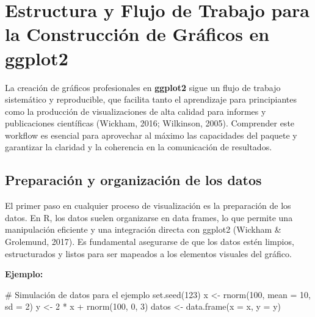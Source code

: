 \documentclass[
  spanish,
  a4paper,
  DIV=11,
  numbers=noendperiod,
  onepage,
  openany]{scrreprt}
\newenvironment{Shaded}{\begin{snugshade}}{\end{snugshade}}
\newcommand{\AttributeTok}[1]{\textcolor[rgb]{0.40,0.45,0.13}{#1}}
\newcommand{\CommentTok}[1]{\textcolor[rgb]{0.37,0.37,0.37}{#1}}
\newcommand{\DecValTok}[1]{\textcolor[rgb]{0.68,0.00,0.00}{#1}}
\newcommand{\FunctionTok}[1]{\textcolor[rgb]{0.28,0.35,0.67}{#1}}
\newcommand{\NormalTok}[1]{\textcolor[rgb]{0.00,0.23,0.31}{#1}}
\newcommand{\OtherTok}[1]{\textcolor[rgb]{0.00,0.23,0.31}{#1}}
\newcommand{\SpecialCharTok}[1]{\textcolor[rgb]{0.37,0.37,0.37}{#1}}
\begin{document}
\section{Estructura y Flujo de Trabajo para la Construcción de Gráficos
en
ggplot2}\label{estructura-y-flujo-de-trabajo-para-la-construcciuxf3n-de-gruxe1ficos-en-ggplot2}

La creación de gráficos profesionales en \textbf{ggplot2} sigue un flujo
de trabajo sistemático y reproducible, que facilita tanto el aprendizaje
para principiantes como la producción de visualizaciones de alta calidad
para informes y publicaciones científicas (Wickham, 2016; Wilkinson,
2005). Comprender este workflow es esencial para aprovechar al máximo
las capacidades del paquete y garantizar la claridad y la coherencia en
la comunicación de resultados.

\subsection{Preparación y organización de los
datos}\label{preparaciuxf3n-y-organizaciuxf3n-de-los-datos}

El primer paso en cualquier proceso de visualización es la preparación
de los datos. En R, los datos suelen organizarse en data frames, lo que
permite una manipulación eficiente y una integración directa con ggplot2
(Wickham \& Grolemund, 2017). Es fundamental asegurarse de que los datos
estén limpios, estructurados y listos para ser mapeados a los elementos
visuales del gráfico.

\textbf{Ejemplo:}

\begin{Shaded}
\begin{Highlighting}[]
\CommentTok{\# Simulación de datos para el ejemplo}
\FunctionTok{set.seed}\NormalTok{(}\DecValTok{123}\NormalTok{)}
\NormalTok{x }\OtherTok{\textless{}{-}} \FunctionTok{rnorm}\NormalTok{(}\DecValTok{100}\NormalTok{, }\AttributeTok{mean =} \DecValTok{10}\NormalTok{, }\AttributeTok{sd =} \DecValTok{2}\NormalTok{)}
\NormalTok{y }\OtherTok{\textless{}{-}} \DecValTok{2} \SpecialCharTok{*}\NormalTok{ x }\SpecialCharTok{+} \FunctionTok{rnorm}\NormalTok{(}\DecValTok{100}\NormalTok{, }\DecValTok{0}\NormalTok{, }\DecValTok{3}\NormalTok{)}
\NormalTok{datos }\OtherTok{\textless{}{-}} \FunctionTok{data.frame}\NormalTok{(}\AttributeTok{x =}\NormalTok{ x, }\AttributeTok{y =}\NormalTok{ y)}
\end{Highlighting}
\end{Shaded}
\end{document}
